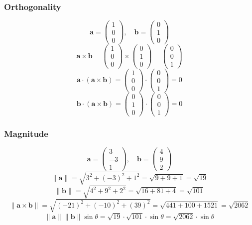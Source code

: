 \documentclass[a4paper,12pt]{article}
\begin{document}
\begin{itemize}[leftmargin=*]
\subsubsection*{Orthogonality}
\[
\mathbf{a} = \begin{pmatrix} 1 \\ 0 \\ 0 \end{pmatrix}, \quad \mathbf{b} = \begin{pmatrix} 0 \\ 1 \\ 0 \end{pmatrix}
\]
\[
\mathbf{a} \times \mathbf{b} = \begin{pmatrix} 1 \\ 0 \\ 0 \end{pmatrix} \times \begin{pmatrix} 0 \\ 1 \\ 0 \end{pmatrix} = \begin{pmatrix} 0 \\ 0 \\ 1 \end{pmatrix}
\]
\[
\mathbf{a} \cdot (\mathbf{a} \times \mathbf{b}) = \begin{pmatrix} 1 \\ 0 \\ 0 \end{pmatrix} \cdot \begin{pmatrix} 0 \\ 0 \\ 1 \end{pmatrix} = 0
\]
\[
\mathbf{b} \cdot (\mathbf{a} \times \mathbf{b}) = \begin{pmatrix} 0 \\ 1 \\ 0 \end{pmatrix} \cdot \begin{pmatrix} 0 \\ 0 \\ 1 \end{pmatrix} = 0
\]

\subsubsection*{Magnitude}
\[
\mathbf{a} = \begin{pmatrix} 3 \\ -3 \\ 1 \end{pmatrix}, \quad \mathbf{b} = \begin{pmatrix} 4 \\ 9 \\ 2 \end{pmatrix}
\]
\[
\|\mathbf{a}\| = \sqrt{3^2 + (-3)^2 + 1^2} = \sqrt{9 + 9 + 1} = \sqrt{19}
\]
\[
\|\mathbf{b}\| = \sqrt{4^2 + 9^2 + 2^2} = \sqrt{16 + 81 + 4} = \sqrt{101}
\]
\[
\|\mathbf{a} \times \mathbf{b}\| = \sqrt{(-21)^2 + (-10)^2 + (39)^2} = \sqrt{441 + 100 + 1521} = \sqrt{2062}
\]
\[
\|\mathbf{a}\| \|\mathbf{b}\| \sin \theta = \sqrt{19} \cdot \sqrt{101} \cdot \sin \theta = \sqrt{2062} \cdot \sin \theta
\]


\end{itemize}
\end{document}
